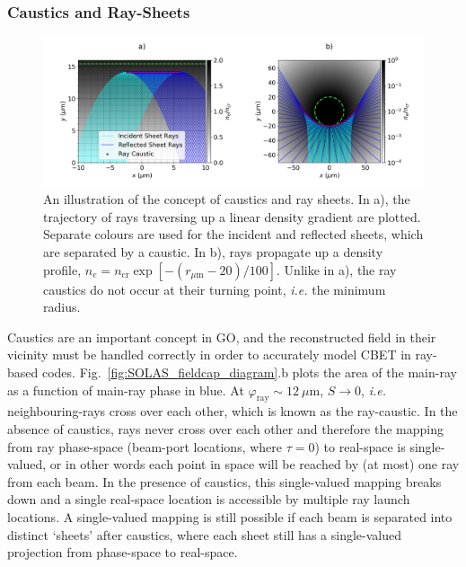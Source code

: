 \subsubsection{Caustics and Ray-Sheets}%
\label{sec:SOLAS_caustics}

\begin{figure}[t!]
    \includegraphics[width=\linewidth]{Numerics/Images/Raysheets_withcyl.png}
    \centering
    \caption{An illustration of the concept of caustics and ray sheets.
    In a), the trajectory of rays traversing up a linear density gradient are plotted.
    Separate colours are used for the incident and reflected sheets, which are separated by a caustic.
    In b), rays propagate up a density profile, $n_e=n_{\text{cr}}\exp{[ -(r_{\mu\text{m}}-20)/100 ]}$.
    Unlike in a), the ray caustics do not occur at their turning point, \textit{i.e.} the minimum radius.}%
    \label{fig:SOLAS_sheet_diagram}
\end{figure}

Caustics are an important concept in \ac{GO}, and the reconstructed field in their vicinity must be handled correctly in order to accurately model \ac{CBET} in ray-based codes.
Fig.~\ref{fig:SOLAS_fieldcap_diagram}.b plots the area of the main-ray as a function of main-ray phase in blue.
At $\varphi_{\text{ray}}\sim12\ \mu\text{m}$, $S\rightarrow 0$, \textit{i.e.} neighbouring-rays cross over each other, which is known as the ray-caustic.
In the absence of caustics, rays never cross over each other and therefore the mapping from ray phase-space (beam-port locations, where $\tau=0$) to real-space is single-valued, or in other words each point in space will be reached by (at most) one ray from each beam.
In the presence of caustics, this single-valued mapping breaks down and a single real-space location is accessible by multiple ray launch locations.
A single-valued mapping is still possible if each beam is separated into distinct `sheets' after caustics, where each sheet still has a single-valued projection from phase-space to real-space.

